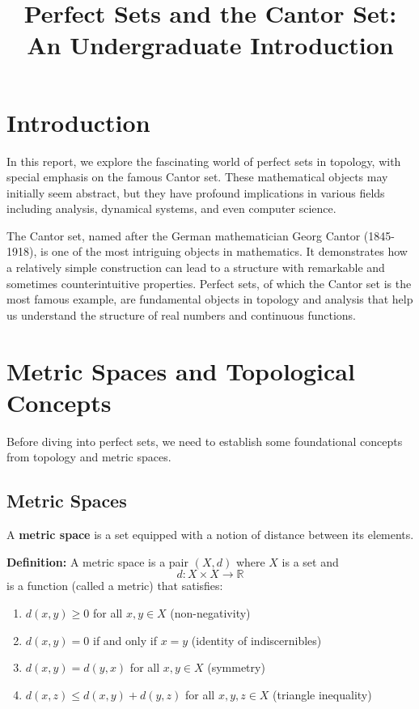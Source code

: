 \documentclass{article}
\begin{document}
\title{Perfect Sets and the Cantor Set: An Undergraduate Introduction}
\author{}
\date{}
\maketitle

\tableofcontents

\section{Introduction}

In this report, we explore the fascinating world of perfect sets in topology, with special emphasis on the famous Cantor set. These mathematical objects may initially seem abstract, but they have profound implications in various fields including analysis, dynamical systems, and even computer science.

The Cantor set, named after the German mathematician Georg Cantor (1845-1918), is one of the most intriguing objects in mathematics. It demonstrates how a relatively simple construction can lead to a structure with remarkable and sometimes counterintuitive properties. Perfect sets, of which the Cantor set is the most famous example, are fundamental objects in topology and analysis that help us understand the structure of real numbers and continuous functions.

\section{Metric Spaces and Topological Concepts}

Before diving into perfect sets, we need to establish some foundational concepts from topology and metric spaces.

\subsection{Metric Spaces}

A \textbf{metric space} is a set equipped with a notion of distance between its elements.

\textbf{Definition:} A metric space is a pair $(X,d)$ where $X$ is a set and 
\[
d: X \times X \rightarrow \mathbb{R}
\]
is a function (called a metric) that satisfies:
\begin{enumerate}
    \item $d(x,y) \geq 0$ for all $x,y \in X$ (non-negativity)
    \item $d(x,y) = 0$ if and only if $x = y$ (identity of indiscernibles)
    \item $d(x,y) = d(y,x)$ for all $x,y \in X$ (symmetry)
    \item $d(x,z) \leq d(x,y) + d(y,z)$ for all $x,y,z \in X$ (triangle inequality)
\end{enumerate}
\end{document}

